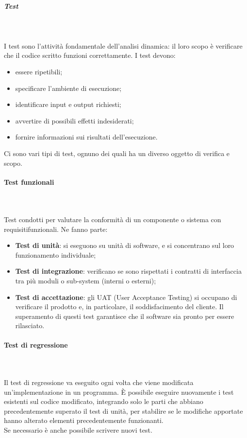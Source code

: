 \subparagraph{Test} \mbox{} \\ \mbox{} \\
I test sono l'attività fondamentale dell'analisi dinamica: il loro scopo è verificare che il codice
scritto funzioni correttamente. I test devono:
\begin{itemize}
\item essere ripetibili;
\item specificare l'ambiente di esecuzione;
\item identificare input e output richiesti;
\item avvertire di possibili effetti indesiderati;
\item fornire informazioni sui risultati dell'esecuzione.
\end{itemize}
Ci sono vari tipi di test, ognuno dei quali ha un diverso oggetto di verifica e scopo.

\paragraph*{Test funzionali} \mbox{} \\ \mbox{} \\
Test condotti per valutare la conformità di un componente o sistema con requisiti\glo funzionali. Ne fanno parte: \begin{itemize}
\item \textbf{Test di unità}: si eseguono su unità di software, e si concentrano sul loro funzionamento individuale;
\item \textbf{Test di integrazione}: verificano se sono rispettati i contratti di interfaccia tra più moduli o sub-system (interni o esterni);
\item \textbf{Test di accettazione}: gli UAT (User Acceptance Testing) si occupano di verificare il prodotto e, in particolare, il soddisfacimento del cliente. Il superamento di questi test garantisce che il software sia pronto per essere rilasciato.
\end{itemize}

\paragraph*{Test di regressione} \mbox{} \\ \mbox{} \\
Il test di regressione va eseguito ogni volta che viene modificata un'implementazione in un programma. È possibile eseguire nuovamente i test esistenti sul codice modificato, integrando solo le parti che abbiano precedentemente superato il test di unità, per stabilire se le modifiche apportate hanno alterato elementi precedentemente funzionanti.\\ Se necessario è anche possibile scrivere nuovi test.

